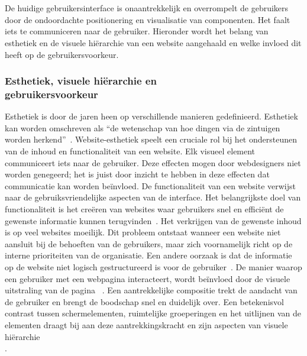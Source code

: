 \chapter{}%
\label{ch:stand-van-zaken}

De huidige gebruikersinterface is onaantrekkelijk en overrompelt de gebruikers door de ondoordachte positionering en visualisatie van componenten. Het faalt iets te communiceren naar de gebruiker. Hieronder wordt het belang van esthetiek en de visuele hiërarchie van een website aangehaald en welke invloed dit heeft op de gebruikersvoorkeur.
\subsection [Esthetiek, hiërarchie en voorkeur]{Esthetiek, visuele hiërarchie en\\gebruikersvoorkeur}
Esthetiek is door de jaren heen op verschillende manieren gedefinieerd. Esthetiek kan worden omschreven als “de wetenschap van hoe dingen via de zintuigen worden herkend”~\autocite[p.~12]{Noponen2017}. Website-esthetiek speelt een cruciale rol bij het ondersteunen van de inhoud en functionaliteit van een website. Elk visueel element communiceert iets naar de gebruiker. Deze effecten mogen door webdesigners niet worden genegeerd; het is juist door inzicht te hebben in deze effecten dat communicatie kan worden beïnvloed. 
De functionaliteit van een website verwijst naar de gebruiksvriendelijke aspecten van de interface. Het belangrijkste doel van functionaliteit is het creëren van websites waar gebruikers snel en efficiënt de gewenste informatie kunnen terugvinden~\autocite{Thorlacius2007}. Het verkrijgen van de gewenste inhoud is op veel websites moeilijk. Dit probleem ontstaat wanneer een website niet aansluit bij de behoeften van de gebruikers, maar zich voornamelijk richt op de interne prioriteiten van de organisatie. Een andere oorzaak is dat de informatie op de website niet logisch gestructureerd is voor de gebruiker~\autocite{Bevan1997}.
De manier waarop een gebruiker met een webpagina interacteert, wordt beïnvloed door de visuele uitstraling van de pagina ~\autocite{Michailidou2008}. Een aantrekkelijke compositie trekt de aandacht van de gebruiker en brengt de boodschap snel en duidelijk over. Een betekenisvol contrast tussen schermelementen, ruimtelijke groeperingen en het uitlijnen van de elementen draagt bij aan deze aantrekkingskracht en zijn aspecten van visuele hiërarchie\\ \autocite{Bhaskar2011}.

